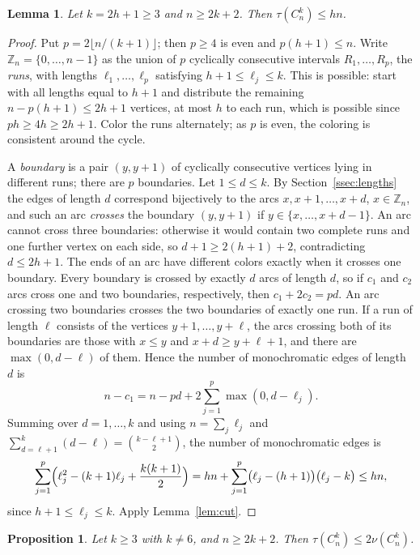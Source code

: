 \documentclass{amsart}
\newtheorem{lemma}[theorem]{Lemma}
\newtheorem{proposition}[theorem]{Proposition}
\theoremstyle{definition}
\theoremstyle{remark}
\numberwithin{equation}{section}
\numberwithin{table}{section}
\newcommand{\Z}{\mathbb{Z}}
\begin{document}
\begin{lemma}\label{lem:oddcover}
Let $k=2h+1\ge3$ and $n\ge2k+2$. Then $\tau(C_n^k)\le hn$.
\end{lemma}

\begin{proof}
Put $p=2\lfloor n/(k+1)\rfloor$; then $p\ge4$ is even and $p(h+1)\le n$. Write $\Z_n=\{0,\dots,n-1\}$ as the union of $p$ cyclically consecutive intervals $R_1,\dots,R_p$, the \emph{runs}, with lengths $\ell_1,\dots,\ell_p$ satisfying $h+1\le\ell_j\le k$. This is possible: start with all lengths equal to $h+1$ and distribute the remaining $n-p(h+1)\le2h+1$ vertices, at most $h$ to each run, which is possible since $ph\ge4h\ge2h+1$. Color the runs alternately; as $p$ is even, the coloring is consistent around the cycle.

A \emph{boundary} is a pair $(y,y+1)$ of cyclically consecutive vertices lying in different runs; there are $p$ boundaries. Let $1\le d\le k$. By Section~\ref{ssec:lengths} the edges of length $d$ correspond bijectively to the arcs $x,x+1,\dots,x+d$, $x\in\Z_n$, and such an arc \emph{crosses} the boundary $(y,y+1)$ if $y\in\{x,\dots,x+d-1\}$. An arc cannot cross three boundaries: otherwise it would contain two complete runs and one further vertex on each side, so $d+1\ge2(h+1)+2$, contradicting $d\le2h+1$. The ends of an arc have different colors exactly when it crosses one boundary. Every boundary is crossed by exactly $d$ arcs of length $d$, so if $c_1$ and $c_2$ arcs cross one and two boundaries, respectively, then $c_1+2c_2=pd$. An arc crossing two boundaries crosses the two boundaries of exactly one run. If a run of length $\ell$ consists of the vertices $y+1,\dots,y+\ell$, the arcs crossing both of its boundaries are those with $x\le y$ and $x+d\ge y+\ell+1$, and there are $\max(0,d-\ell)$ of them. Hence the number of monochromatic edges of length $d$ is
\[
n-c_1=n-pd+2\sum_{j=1}^p\max(0,d-\ell_j).
\]
Summing over $d=1,\dots,k$ and using $n=\sum_j\ell_j$ and $\sum_{d=\ell+1}^{k}(d-\ell)=\binom{k-\ell+1}2$, the number of monochromatic edges is
\[
\sum_{j=1}^p\Bigl(\ell_j^2-(k+1)\ell_j+\frac{k(k+1)}2\Bigr)
= h n+\sum_{j=1}^p\bigl(\ell_j-(h+1)\bigr)\bigl(\ell_j-k\bigr)\le hn,
\]
since $h+1\le\ell_j\le k$. Apply Lemma~\ref{lem:cut}.
\end{proof}

\begin{proposition}\label{prop:cyclegeneral}
Let $k\ge3$ with $k\ne6$, and $n\ge2k+2$. Then $\tau(C_n^k)\le2\nu(C_n^k)$.
\end{proposition}
\end{document}
